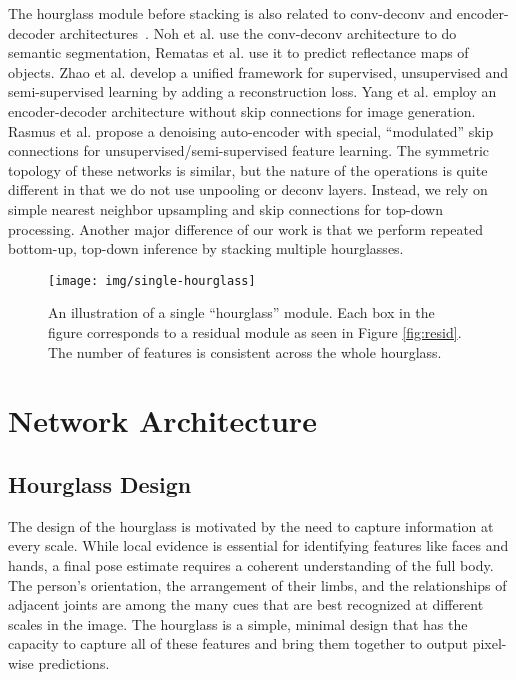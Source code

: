 \documentclass[runningheads]{llncs}
\begin{document}
The hourglass module before stacking is also related to conv-deconv
and encoder-decoder architectures~\cite{noh2015learning,
  zhao2015stacked, rematas2015deep, badrinarayanan2015segnet}.  Noh et
al. \cite{noh2015learning} use the conv-deconv architecture to do
semantic segmentation, Rematas et al. \cite{rematas2015deep} use it to
predict reflectance maps of objects. Zhao et
al. \cite{zhao2015stacked} develop a unified framework for supervised,
unsupervised and semi-supervised learning by adding a reconstruction
loss. Yang et al. \cite{yang2015nips} employ an encoder-decoder
architecture without skip connections for image generation. Rasmus et
al. \cite{rasmus2015semi} propose a denoising auto-encoder with
special, ``modulated'' skip connections for
unsupervised/semi-supervised feature learning.  The symmetric topology
of these networks is similar, but the nature of the operations is
quite different in that we do not use unpooling or deconv
layers. Instead, we rely on simple nearest neighbor upsampling and
skip connections for top-down processing. Another major difference of
our work is that we perform repeated bottom-up, top-down inference by
stacking multiple hourglasses.



\begin{figure}[t]
\centering
\texttt{[image: img/single-hourglass]}
\caption{An illustration of a single ``hourglass'' module. Each box in
  the figure corresponds to a residual module as seen in Figure
  \ref{fig:resid}. The number of features is consistent across the
  whole hourglass.}
\label{fig:single-hg}
\end{figure}

\section{Network Architecture}

\subsection{Hourglass Design}

The design of the hourglass is motivated by the need to capture
information at every scale. While local evidence is essential for
identifying features like faces and hands, a final pose estimate
requires a coherent understanding of the full body. The person's
orientation, the arrangement of their limbs, and the relationships of
adjacent joints are among the many cues that are best recognized at
different scales in the image. The hourglass is a simple, minimal
design that has the capacity to capture all of these features and
bring them together to output pixel-wise predictions.
\end{document}

